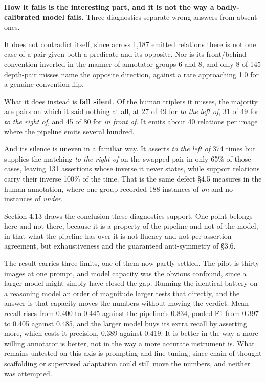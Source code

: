 \textbf{How it fails is the interesting part, and it is not the way a badly-calibrated model fails.} Three diagnostics separate wrong answers from absent ones.

It does not contradict itself, since across 1,187 emitted relations there is not one case of a pair given both a predicate and its opposite. Nor is its front/behind convention inverted in the manner of annotator groups 6 and 8, and only 8 of 145 depth-pair misses name the opposite direction, against a rate approaching 1.0 for a genuine convention flip.

What it does instead is \textbf{fall silent}. Of the human triplets it misses, the majority are pairs on which it said nothing at all, at 27 of 49 for \textit{to the left of}, 31 of 49 for \textit{to the right of}, and 45 of 80 for \textit{in front of}. It emits about 40 relations per image where the pipeline emits several hundred.

And its silence is uneven in a familiar way. It asserts \textit{to the left of} 374 times but supplies the matching \textit{to the right of} on the swapped pair in only 65\% of those cases, leaving 131 assertions whose inverse it never states, while support relations carry their inverse 100\% of the time. That is the same defect \S{}4.5 measures in the human annotation, where one group recorded 188 instances of \textit{on} and no instances of \textit{under}.

Section 4.13 draws the conclusion these diagnostics support. One point belongs here and not there, because it is a property of the pipeline and not of the model, in that what the pipeline has over it is not fluency and not per-assertion agreement, but exhaustiveness and the guaranteed anti-symmetry of \S{}3.6.

The result carries three limits, one of them now partly settled. The pilot is thirty images at one prompt, and model capacity was the obvious confound, since a larger model might simply have closed the gap. Running the identical battery on a reasoning model an order of magnitude larger tests that directly, and the answer is that capacity moves the numbers without moving the verdict. Mean recall rises from 0.400 to 0.445 against the pipeline's 0.834, pooled F1 from 0.397 to 0.405 against 0.485, and the larger model buys its extra recall by asserting more, which costs it precision, 0.389 against 0.419. It is better in the way a more willing annotator is better, not in the way a more accurate instrument is. What remains untested on this axis is prompting and fine-tuning, since chain-of-thought scaffolding or supervised adaptation could still move the numbers, and neither was attempted.

